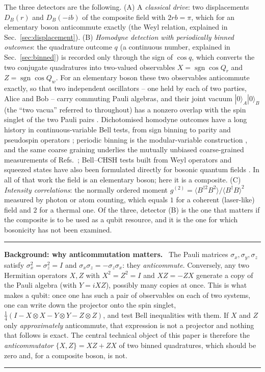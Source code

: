 \documentclass[11pt,a4paper]{article}
\newcommand{\sgn}{\operatorname{sgn}}
\newcommand{\ket}[1]{|#1\rangle}
\newenvironment{background}[1]{\par\medskip\noindent\hrule\smallskip\noindent\textbf{Background: #1.}\ \ignorespaces}{\par\smallskip\noindent\hrule\medskip}
\begin{document}
The three detectors are the following. (A) A \emph{classical drive}: two displacements $D_B(r)$ and $D_B(-ib)$ of the composite field with $2rb=\pi$, which for an elementary boson anticommute exactly (the Weyl relation, explained in Sec.~\ref{sec:displacement}). (B) \emph{Homodyne detection with periodically binned outcomes}: the quadrature outcome $q$ (a continuous number, explained in Sec.~\ref{sec:binned}) is recorded only through the sign of $\cos q$, which converts the two conjugate quadratures into two-valued observables $X=\sgn\cos Q_r$ and $Z=\sgn\cos Q_w$. For an elementary boson these two observables anticommute exactly, so that two independent oscillators -- one held by each of two parties, Alice and Bob -- carry commuting Pauli algebras, and their joint vacuum $\ket0_A\ket0_B$ (the ``two vacua'' referred to throughout) has a nonzero overlap with the spin singlet of the two Pauli pairs \cite{Sorella2026}. Dichotomised homodyne outcomes have a long history in continuous-variable Bell tests, from sign binning \cite{Gilchrist1998,Munro1999,Wenger2003,GarciaPatron2004} to parity and pseudospin operators \cite{Banaszek1999,Chen2002}; periodic binning is the modular-variable construction \cite{Aharonov1969,VernazGris2014,Ketterer2016}, and the same coarse graining underlies the mutually unbiased coarse-grained measurements of Refs.~\cite{Tasca2018,Paul2018}; Bell--CHSH tests built from Weyl operators and squeezed states have also been formulated directly for bosonic quantum fields \cite{Dudal2023}. In all of that work the field is an elementary boson; here it is a composite. (C) \emph{Intensity correlations}: the normally ordered moment $g^{(2)}=\langle B^{\dagger2}B^2\rangle/\langle B^\dagger B\rangle^2$ measured by photon or atom counting, which equals $1$ for a coherent (laser-like) field and $2$ for a thermal one. Of the three, detector (B) is the one that matters if the composite is to be used as a qubit resource, and it is the one for which bosonicity has not been examined.

\begin{background}{why anticommutation matters}
The Pauli matrices $\sigma_x,\sigma_y,\sigma_z$ satisfy $\sigma_x^2=\sigma_z^2=I$ and $\sigma_x\sigma_z=-\sigma_z\sigma_x$: they \emph{anticommute}. Conversely, any two Hermitian operators $X,Z$ with $X^2=Z^2=I$ and $XZ=-ZX$ generate a copy of the Pauli algebra (with $Y=iXZ$), possibly many copies at once. This is what makes a qubit: once one has such a pair of observables on each of two systems, one can write down the projector onto the spin singlet, $\frac14(I-X\otimes X-Y\otimes Y-Z\otimes Z)$, and test Bell inequalities with them. If $X$ and $Z$ only \emph{approximately} anticommute, that expression is not a projector and nothing that follows is exact. The central technical object of this paper is therefore the \emph{anticommutator} $\{X,Z\}=XZ+ZX$ of two binned quadratures, which should be zero and, for a composite boson, is not.
\end{background}
\end{document}

